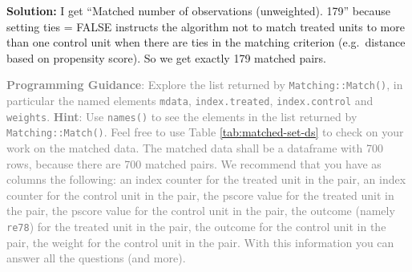 \documentclass[
]{article}
\begin{document}
\textbf{Solution:} I get ``Matched number of observations (unweighted).
179'' because setting ties = FALSE instructs the algorithm not to match
treated units to more than one control unit when there are ties in the
matching criterion (e.g.~distance based on propensity score). So we get
exactly 179 matched pairs.

\textcolor{gray}{\textbf{Programming Guidance}: Explore the list returned by \texttt{Matching::Match()}, in particular the named elements \texttt{mdata}, \texttt{index.treated}, \texttt{index.control} and \texttt{weights}.}
\textcolor{gray}{\textbf{Hint}: Use \texttt{names()} to see the elements in the list returned by \texttt{Matching::Match()}. Feel free to use Table \ref{tab:matched-set-ds} to check on your work on the matched data. The matched data shall be a dataframe with 700 rows, because there are 700 matched pairs. We recommend that you have as columns the following: an index counter for the treated unit in the pair, an index counter for the control unit in the pair, the pscore value for the treated unit in the pair, the pscore value for the control unit in the pair, the outcome (namely \texttt{re78}) for the treated unit in the pair, the outcome for the control unit in the pair, the weight for the control unit in the pair. With this information you can answer all the questions (and more).}
\end{document}
